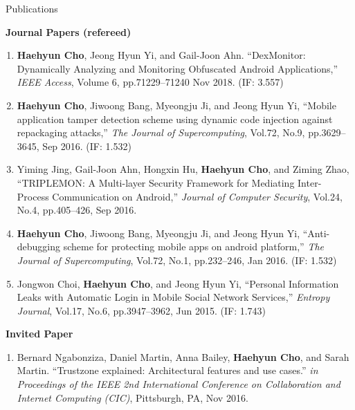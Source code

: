 \documentclass{resume} %
\makeatletter
\newlength{\bibhang}
\newlength{\bibsep}
{\@listi \global\bibsep\itemsep \global\advance\bibsep by\parsep}
\newenvironment{bibsection}%
{\begin{enumerate}{}{%
			\setlength{\leftmargin}{\bibhang}%
			\setlength{\itemindent}{-\leftmargin}%
			\setlength{\itemsep}{\bibsep}%
			\setlength{\parsep}{\z@}%
			\setlength{\partopsep}{0pt}%
			\setlength{\topsep}{0pt}}}
	{\end{enumerate}\vspace{-.6\baselineskip}}
\makeatother
\begin{document}
\begin{rSection}{\faGenderless~Publications}
\begin{bibsection}
	\end{bibsection}

	\vspace{3mm}
	
    \strut\textbullet~{\bf Journal Papers (refereed)}
	\begin{bibsection}
		\item {\bf Haehyun Cho}, Jeong Hyun Yi, and Gail-Joon Ahn.
        ``DexMonitor: Dynamically Analyzing and Monitoring Obfuscated Android Applications,'' 
        \emph{IEEE Access},
        Volume 6, pp.71229--71240
        Nov 2018. (IF: 3.557)

		\item {\bf Haehyun Cho}, Jiwoong Bang, Myeongju Ji, and Jeong Hyun Yi, 
		``Mobile application tamper detection scheme using dynamic code injection against repackaging attacks,'' 
		\emph{The Journal of Supercomputing}, 
		Vol.72, No.9, pp.3629--3645, Sep 2016. (IF: 1.532)

		\item Yiming Jing, Gail-Joon Ahn, Hongxin Hu, {\bf Haehyun Cho}, and Ziming Zhao,
		``TRIPLEMON: A Multi-layer Security Framework for Mediating Inter-Process Communication on Android,'' 
		\emph{Journal of Computer Security}, 
		Vol.24, No.4, pp.405--426, Sep 2016.

		\item {\bf Haehyun Cho}, Jiwoong Bang, Myeongju Ji, and Jeong Hyun Yi, 
		``Anti-debugging scheme for protecting mobile apps on android platform,'' 
		\emph{The Journal of Supercomputing}, 
		Vol.72, No.1, pp.232--246, Jan 2016. (IF: 1.532)

		\item Jongwon Choi, {\bf Haehyun Cho}, and Jeong Hyun Yi, 
		``Personal Information Leaks with Automatic Login in Mobile Social Network Services,'' 
		\emph{Entropy Journal}, 
		Vol.17, No.6, pp.3947--3962, Jun 2015. (IF: 1.743)
	\end{bibsection}

    \vspace{3mm}
   
    \strut\textbullet~{\bf Invited Paper}
    \begin{bibsection}
        \item Bernard Ngabonziza, Daniel Martin, Anna Bailey, {\bf Haehyun Cho}, and Sarah Martin.
        ``Trustzone explained: Architectural features and use cases.''
        \emph{in Proceedings of the IEEE 2nd International Conference on Collaboration and Internet Computing (CIC)}, 
        Pittsburgh, PA, Nov 2016.    
    \end{bibsection}

	\vspace{5mm}
\end{rSection}
\end{document}
